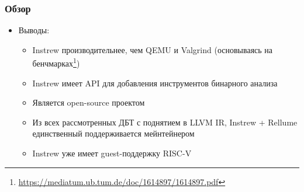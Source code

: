 \documentclass{beamer}
\begin{document}
\begin{frame}
	\frametitle{Обзор}
	\begin{itemize}
		\item Выводы:
		      \begin{itemize}
			      \item Instrew производительнее, чем QEMU и Valgrind (основываясь на бенчмарках\footnote{\href{https://mediatum.ub.tum.de/doc/1614897/1614897.pdf}{https://mediatum.ub.tum.de/doc/1614897/1614897.pdf}})
			      \item Instrew имеет API для добавления инструментов бинарного анализа
			      \item Является open-source проектом
			      \item Из всех рассмотренных ДБТ с поднятием в LLVM IR, Instrew + Rellume единственный поддерживается мейнтейнером
			      \item Instrew уже имеет guest-поддержку RISC-V
		      \end{itemize}
	\end{itemize}
\end{frame}

\end{document}
